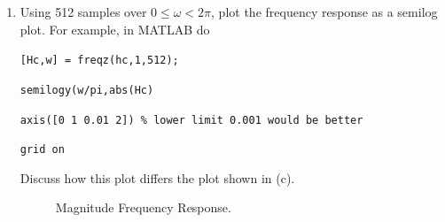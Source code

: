 \documentclass[fleqn]{article}
\begin{document}
\begin{enumerate}
\begin{enumerate}[nolistsep]
			\begin{figure}[H]
				\centerline{}
				\caption{\doublespacing Comparison of $|H(k)|$ to $|H_c(e^{j\omega})|$ when Endpoints are Not Halved.}
				\label{freq_response_raw_endpoints}
			\end{figure}
			
			Comparing, Figure \ref{freq_response_halved_endpoints} to Figure \ref{freq_response_raw_endpoints}, it is clear that halving the endpoints preserves the magnitude of the frequency response samples $H[k]$, while selecting the raw endpoints does not. Therefore, we have chosen the best option for the causal, symmetric impulse response $h_c[n]$.
			
			\item Using 512 samples over $0 \leq \omega < 2\pi$, plot the frequency response as a semilog plot. For example, in MATLAB do
			
			\texttt{[Hc,w] = freqz(hc,1,512);}
			
			\texttt{semilogy(w/pi,abs(Hc)}
			
			\texttt{axis([0 1 0.01 2]) \% lower limit 0.001 would be better}
			
			\texttt{grid on}
			
			Discuss how this plot differs the plot shown in (c).
			
			\begin{figure}[H]
				\centerline{}
				\caption{Magnitude Frequency Response.}
			\end{figure}
			

\end{enumerate}
\end{enumerate}
\end{document}
